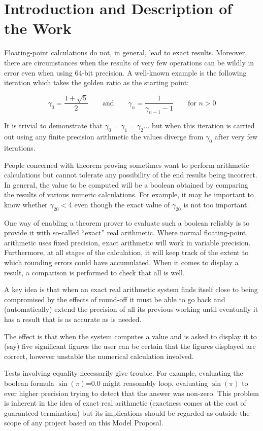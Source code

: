 \documentclass[12pt]{article}
\begin{document}
\section*{Introduction and Description of the Work}

Floating-point calculations do not, in general, lead to exact results.
Moreover, there are circumstances when the results of very few
operations can be wildly in error even when using 64-bit precision.  A
well-known example is the following iteration which takes the golden
ratio as the starting point:

\[
\gamma_0=\frac{1+\sqrt5}{2}\qquad \mbox{and}\qquad
\gamma_{n}=\frac{1}{\gamma_{n-1}-1}\qquad
\mbox{for $n>0$}
\]

It is trivial to demonstrate that $\gamma_0=\gamma_1=\gamma_2\ldots$
but when this iteration is carried out using any finite precision
arithmetic the values diverge from $\gamma_0$ after very few
iterations.

People concerned with theorem proving sometimes want to perform
arithmetic calculations but cannot tolerate any possibility of the end
results being incorrect.  In general, the value to be computed will be
a boolean obtained by comparing the results of various numeric
calculations.  For example, it may be important to know whether
$\gamma_{20}${}$<$4 even though the exact value of $\gamma_{20}$ is
not too important.

One way of enabling a theorem prover to evaluate such a boolean
reliably is to provide it with so-called ``exact'' real arithmetic.
Where normal floating-point arithmetic uses fixed precision, exact
arithmetic will work in variable precision.  Furthermore, at all
stages of the calculation, it will keep track of the extent to which
rounding errors could have accumulated.  When it comes to display a
result, a comparison is performed to check that all is well.

A key idea is that when an exact real arithmetic system finds itself
close to being compromised by the effects of round-off it must be able
to go back and (automatically) extend the precision of all its
previous working until eventually it has a result that is as accurate
as is needed.

The effect is that when the system computes a value and is asked to
display it to (say) five significant figures the user can be certain
that the figures displayed are correct, however unstable the numerical
calculation involved.

Tests involving equality necessarily give trouble.  For example,
evaluating the boolean formula $\sin(\pi)$=0.0 might reasonably loop,
evaluating $\sin(\pi)$ to ever higher precision trying to detect that
the answer was non-zero.  This problem is inherent in the idea of
exact real arithmetic (exactness comes at the cost of guaranteed
termination) but its implications should be regarded as outside the
scope of any project based on this Model Proposal.
\end{document}

